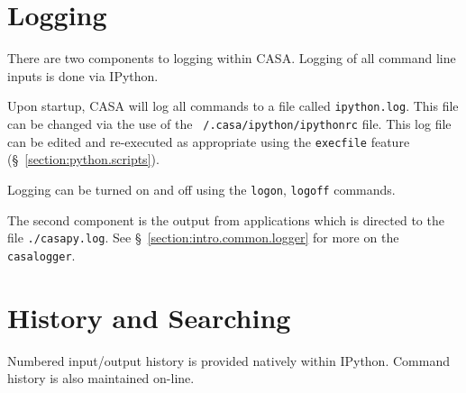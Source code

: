 \section{Logging}
\label{section:python.log}

There are two components to logging within CASA. Logging of all
command line inputs is done via IPython. 

Upon startup, CASA will log all commands to a file called
{\tt ipython.log}. This file can be changed via the use of the 
{\tt ~/.casa/ipython/ipythonrc} file. 
This log file can be edited and
re-executed as appropriate using the 
{\tt execfile} feature (\S~\ref{section:python.scripts}).

%
%
%
%
%
Logging can be turned on and off using the {\tt logon}, {\tt logoff} commands.

The second component is the output from applications which is directed
to the file {\tt ./casapy.log}.  See \S~\ref{section:intro.common.logger}
for more on the {\tt casalogger}.

\section{History and Searching}
\label{section:python.hist}

Numbered input/output history is provided natively within
IPython. Command history is also maintained on-line. 

